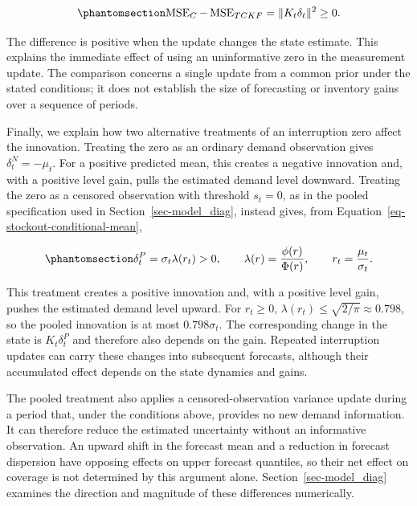 \documentclass[
  11pt,
  authoryear,
  doubleblind,
  3p]{elsarticle}
\begin{document}
\begin{equation}\phantomsection\label{eq-mse}{
\operatorname{MSE}_{C}
-
\operatorname{MSE}_{TCKF}
=
\lVert K_t\delta_t\rVert^2
\geq 0.
}\end{equation}

The difference is positive when the update changes the state estimate.
This explains the immediate effect of using an uninformative zero in the
measurement update. The comparison concerns a single update from a
common prior under the stated conditions; it does not establish the size
of forecasting or inventory gains over a sequence of periods.

Finally, we explain how two alternative treatments of an interruption
zero affect the innovation. Treating the zero as an ordinary demand
observation gives \(\delta_t^{N}=-\mu_t\). For a positive predicted
mean, this creates a negative innovation and, with a positive level
gain, pulls the estimated demand level downward. Treating the zero as a
censored observation with threshold \(s_t=0\), as in the pooled
specification used in Section~\ref{sec-model_diag}, instead gives, from
Equation~\ref{eq-stockout-conditional-mean},

\begin{equation}\phantomsection\label{eq-pooled-innovation}{
\delta_t^{P}
=
\sigma_t\lambda(r_t)
>
0,
\qquad
\lambda(r)=\frac{\phi(r)}{\Phi(r)},
\qquad
r_t=\frac{\mu_t}{\sigma_t}.
}\end{equation}

This treatment creates a positive innovation and, with a positive level
gain, pushes the estimated demand level upward. For \(r_t\geq0\),
\(\lambda(r_t)\leq\sqrt{2/\pi}\approx0.798\), so the pooled innovation
is at most \(0.798\sigma_t\). The corresponding change in the state is
\(K_t\delta_t^{P}\) and therefore also depends on the gain. Repeated
interruption updates can carry these changes into subsequent forecasts,
although their accumulated effect depends on the state dynamics and
gains.

The pooled treatment also applies a censored-observation variance update
during a period that, under the conditions above, provides no new demand
information. It can therefore reduce the estimated uncertainty without
an informative observation. An upward shift in the forecast mean and a
reduction in forecast dispersion have opposing effects on upper forecast
quantiles, so their net effect on coverage is not determined by this
argument alone. Section~\ref{sec-model_diag} examines the direction and
magnitude of these differences numerically.
\end{document}
